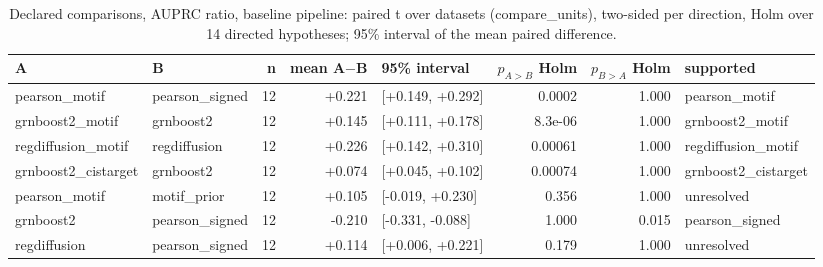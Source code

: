 \begin{table}[H]\centering\small
\caption{Declared comparisons, AUPRC ratio, baseline pipeline: paired t over datasets (compare\_units), two-sided per direction, Holm over 14 directed hypotheses; 95\% interval of the mean paired difference.}
\begin{tabular}{llrrlrrl}\toprule
A & B & n & mean A$-$B & 95\% interval & $p_{A>B}$ Holm & $p_{B>A}$ Holm & supported \\ \midrule
pearson\_motif & pearson\_signed & 12 & +0.221 & [+0.149, +0.292] & 0.0002 & 1.000 & pearson\_motif \\
grnboost2\_motif & grnboost2 & 12 & +0.145 & [+0.111, +0.178] & 8.3e-06 & 1.000 & grnboost2\_motif \\
regdiffusion\_motif & regdiffusion & 12 & +0.226 & [+0.142, +0.310] & 0.00061 & 1.000 & regdiffusion\_motif \\
grnboost2\_cistarget & grnboost2 & 12 & +0.074 & [+0.045, +0.102] & 0.00074 & 1.000 & grnboost2\_cistarget \\
pearson\_motif & motif\_prior & 12 & +0.105 & [-0.019, +0.230] & 0.356 & 1.000 & unresolved \\
grnboost2 & pearson\_signed & 12 & -0.210 & [-0.331, -0.088] & 1.000 & 0.015 & pearson\_signed \\
regdiffusion & pearson\_signed & 12 & +0.114 & [+0.006, +0.221] & 0.179 & 1.000 & unresolved \\
\bottomrule\end{tabular}\end{table}
